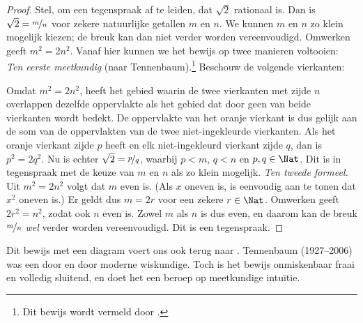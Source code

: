 \documentclass[openany]{memoir}
\begin{document}
\begin{proof}
Stel, om een tegenspraak af te leiden, dat $\sqrt{2}$ rationaal is.
Dan is $\sqrt{2} = \nicefrac{m}{n}$ voor zekere natuurlijke getallen
$m$ en $n$. We kunnen $m$ en $n$ zo klein mogelijk kiezen; de breuk
kan dan niet verder worden vereenvoudigd. Omwerken geeft $m^{2} =
2n^{2}$. Vanaf hier
kunnen we het bewijs op twee manieren voltooien:
\emph{Ten eerste meetkundig} (naar Tennenbaum).\footnote{Dit bewijs
wordt vermeld door \cite{Conway2006}.} Beschouw de volgende vierkanten:
\begin{center}	
\end{center}
Omdat $m^2 = 2n^2$, heeft het gebied waarin de twee vierkanten met
zijde $n$ overlappen dezelfde oppervlakte als het gebied dat door
geen van beide vierkanten wordt bedekt. De oppervlakte van het oranje
vierkant is dus gelijk aan de som van de oppervlakten van de twee
niet-ingekleurde vierkanten. Als het oranje vierkant zijde $p$ heeft
en elk niet-ingekleurd vierkant zijde $q$, dan is $p^2 = 2q^2$. Nu is
echter $\sqrt{2} = \nicefrac{p}{q}$, waarbij $p < m$, $q < n$ en $p, q
\in \Nat$. Dit is in tegenspraak met de keuze van $m$ en $n$ als zo
klein mogelijk.
\emph{Ten tweede formeel.} Uit $m^{2} = 2n^{2}$ volgt dat $m$ even is.
(Als $x$ oneven is, is eenvoudig aan te tonen dat $x^2$ oneven is.)
Er geldt dus $m = 2r$ voor een zekere $r \in \Nat$. Omwerken geeft
$2r^2 = n^2$,
zodat ook $n$ even is. Zowel $m$ als $n$ is dus even, en daarom kan de
breuk $\nicefrac{m}{n}$ \emph{wel} verder worden vereenvoudigd. Dit
is een tegenspraak.
\end{proof}
Dit bewijs met een diagram voert ons ook terug naar
. Tennenbaum (1927--2006) was een door
en door moderne wiskundige. Toch is het bewijs onmiskenbaar fraai en
volledig sluitend, en doet het een beroep op meetkundige intuïtie.
\end{document}
